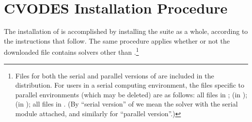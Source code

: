 \chapter{CVODES Installation Procedure}\label{s:install}

The installation of {\cvodes} is accomplished by installing the
{\sundials} suite as a whole, according to the instructions that
follow.   The same procedure applies whether or not the downloaded
file contains solvers other than {\cvodes}.\footnote{Files for both the
serial and parallel versions of {\cvodes} are included in the distribution.
For users in a serial computing environment, the files specific to parallel
environments (which may be deleted) are as follows:
all files in ;
 (in );
 (in ); 
all files in .
(By ``serial version'' of {\cvodes} we mean the {\cvodes} solver with the
serial {\nvector} module attached, and similarly for ``parallel version''.)}

